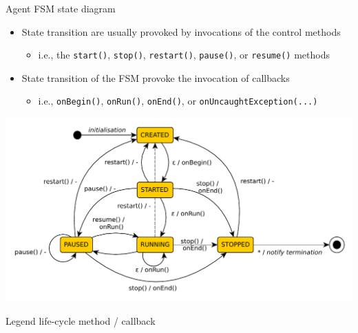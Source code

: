 \documentclass[presentation]{beamer}\mode<presentation>{\usetheme{AMSCesenaPurpleAndGold}}
\begin{document}
\begin{frame}[allowframebreaks]{Agent FSM state diagram}
\begin{itemize}
        \framebreak

        \item State transition are usually provoked by invocations of the \alert{control methods}
        \begin{itemize}
        	\item i.e., the \texttt{start()}, \texttt{stop()}, \texttt{restart()}, \texttt{pause()}, or \texttt{resume()} methods
        \end{itemize}



        \bigskip

        \item State transition of the FSM provoke the invocation of callbacks
        \begin{itemize}
        	\item i.e., \texttt{onBegin()}, \texttt{onRun()}, \texttt{onEnd()}, or \texttt{onUncaughtException(...)}
        \end{itemize}
    \end{itemize}

    \framebreak

    \begin{center}
        \includegraphics[width=.8\linewidth]{img/fsm.pdf}
    \end{center}

    \begin{block}{Legend}\centering
        life-cycle method / callback
    \end{block}

\end{frame}
\end{document}
